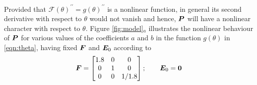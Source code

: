 \begin{itemize}
Provided that $\mathcal{F}(\theta)^{\prime\prime}=g(\theta)^{\prime\prime}$ is a nonlinear function, in general its second derivative with respect to $\theta$ would not vanish and hence, $\boldsymbol{P}$ will have a nonlinear character with respect to $\theta$. Figure \ref{fig:model}$_a$ illustrates the nonlinear behaviour of $\boldsymbol{P}$ for various values of the coefficients $a$ and $b$ in the function $g(\theta)$ in \eqref{eqn:theta}, having fixed $\boldsymbol{F}$ and $\boldsymbol{E}_0$ according to
%
\begin{equation}\label{eqn:fixed values}
\boldsymbol{F}=\begin{bmatrix}
1.8 & 0 & 0\\
0  &  1  &  0\\
0  &  0  &  1/1.8
\end{bmatrix}; \qquad \boldsymbol{E}_0=\boldsymbol{0}
\end{equation}



\end{itemize}
